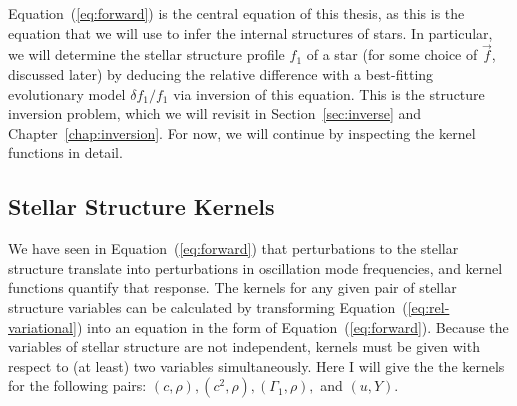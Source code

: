 Equation~(\ref{eq:forward}) is the central equation of this thesis, as this is the equation that we will use to infer the internal structures of stars. 
In particular, we will determine the stellar structure profile $f_1$ of a star (for some choice of $\vec{f}$, discussed later) by deducing the relative difference with a best-fitting evolutionary model ${\delta f_1/f_1}$ via inversion of this equation. 
This is the structure inversion problem, which we will revisit in Section~\ref{sec:inverse} and Chapter~\ref{chap:inversion}. 
For now, we will continue by inspecting the kernel functions in detail. 
%


\subsection{Stellar Structure Kernels}
\label{sec:kernels}
We have seen in Equation~(\ref{eq:forward}) that perturbations to the stellar structure translate into perturbations in oscillation mode frequencies, and kernel functions quantify that response. 
The kernels for any given pair of stellar structure variables can be calculated by transforming Equation~(\ref{eq:rel-variational}) into an equation in the form of Equation~(\ref{eq:forward}). 
Because the variables of stellar structure are not independent, kernels must be given with respect to (at least) two variables simultaneously. 
Here I will give the the kernels for the following pairs: ${(c,\rho)}, {(c^2,\rho)}, {(\Gamma_1,\rho)},$ and ${(u,Y)}$. 


